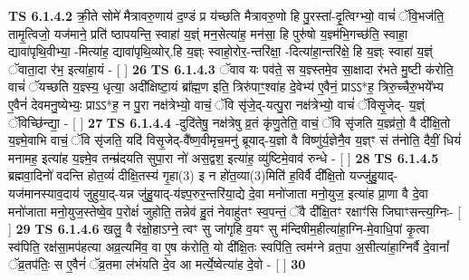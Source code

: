 \documentclass[17pt]{extarticle}
\begin{document}
                                \textbf{ TS 6.1.4.2} \newline
                  क्री॒ते सोमे॑ मैत्रावरु॒णाय॑ द॒ण्डं प्र य॑च्छति मैत्रावरु॒णो हि पु॒रस्ता॑-दृ॒त्विग्भ्यो॒ वाचं॑ ॅवि॒भज॑ति॒ तामृ॒त्विजो॒ यज॑माने॒ प्रति॑ ष्ठापयन्ति॒ स्वाहा॑ य॒ज्ञ्ं मन॒सेत्या॑ह॒ मन॑सा॒ हि पुरु॑षो य॒ज्ञ्म॑भि॒गच्छ॑ति॒ स्वाहा॒ द्यावा॑पृथि॒वीभ्या॒ -मित्या॑ह॒ द्यावा॑पृथि॒व्योर्.हि य॒ज्ञ्ः स्वाहो॒रोर॒-न्तरि॑क्षा॒ -दित्या॑हा॒न्तरि॑क्षे॒ हि य॒ज्ञ्ः स्वाहा॑ य॒ज्ञ्ं ॅवाता॒दा र॑भ॒ इत्या॑हा॒यं - [  ] \textbf{  26} \newline
                  \newline
                                \textbf{ TS 6.1.4.3} \newline
                  ॅवाव यः पव॑ते॒ स य॒ज्ञ्स्तमे॒व सा॒क्षादा र॑भते मु॒ष्टी क॑रोति॒ वाचं॑ ॅयच्छति य॒ज्ञ्स्य॒ धृत्या॒ अदी᳚क्षिष्टा॒यं ब्रा᳚ह्म॒ण इति॒ त्रिरु॑पाꣳ॒॒श्वा॑ह दे॒वेभ्य॑ ए॒वैनं॒ प्राऽऽ*ह॒ त्रिरु॒च्चैरु॒भये᳚भ्य ए॒वैनं॑ देवमनु॒ष्येभ्यः॒ प्राऽऽ*ह॒ न पु॒रा नक्ष॑त्रेभ्यो॒ वाचं॒ ॅवि सृ॑जे॒द्-यत्पु॒रा नक्ष॑त्रेभ्यो॒ वाचं॑ ॅविसृ॒जेद्- य॒ज्ञ्ं ॅविच्छि॑न्द्या॒ - [  ] \textbf{  27} \newline
                  \newline
                                \textbf{ TS 6.1.4.4} \newline
                  -दुदि॑तेषु॒ नक्ष॑त्रेषु व्र॒तं कृ॑णु॒तेति॒ वाचं॒ ॅवि सृ॑जति य॒ज्ञ्व्र॑तो॒ वै दी᳚क्षि॒तो य॒ज्ञ्मे॒वाभि वाचं॒ ॅवि सृ॑जति॒ यदि॑ विसृ॒जेद्-वै᳚ष्ण॒वीमृच॒मनु॑ ब्रूयाद्-य॒ज्ञो वै विष्णु॑र्य॒ज्ञेनै॒व य॒ज्ञ्ꣳ सं त॑नोति॒ दैवीं॒ धियं॑ मनामह॒ इत्या॑ह य॒ज्ञ्मे॒व तन्म्र॑दयति सुपा॒रा नो॑ अस॒द्वश॒ इत्या॑ह॒ व्यु॑ष्टिमे॒वाव॑ रुन्धे - [  ] \textbf{  28} \newline
                  \newline
                                \textbf{ TS 6.1.4.5} \newline
                  ब्रह्मवा॒दिनो॑ वदन्ति होत॒व्यं॑ दीक्षि॒तस्य॑ गृ॒हा(3) इ न हो॑त॒व्या(3)मिति॑ ह॒विर्वै दी᳚क्षि॒तो यज्जु॑हु॒याद्-यज॑मानस्याव॒दाय॑ जुहुया॒द्-यन्न जु॑हु॒याद्-य॑ज्ञ्प॒रुर॒न्तरि॑या॒द्ये दे॒वा मनो॑जाता मनो॒युज॒ इत्या॑ह प्रा॒णा वै दे॒वा मनो॑जाता मनो॒युज॒स्तेष्वे॒व प॒रोक्षं॑ जुहोति॒ तन्नेव॑ हु॒तं नेवाहु॑तꣳ स्व॒पन्तं॒ ॅवै दी᳚क्षि॒तꣳ रक्षाꣳ॑सि जिघाꣳसन्त्य॒ग्निः- [  ] \textbf{  29} \newline
                  \newline
                                \textbf{ TS 6.1.4.6} \newline
                  खलु॒ वै र॑क्षो॒हाऽग्ने॒ त्वꣳ सु जा॑गृहि व॒यꣳ सु म॑न्दिषीम॒हीत्या॑हा॒ग्नि-मे॒वाधि॒पां कृ॒त्वा स्व॑पिति॒ रक्ष॑सा॒मप॑हत्या अव्र॒त्यमि॑व॒ वा ए॒ष क॑रोति॒ यो दी᳚क्षि॒तः स्वपि॑ति॒ त्वम॑ग्ने व्रत॒पा अ॒सीत्या॑हा॒ग्निर्वै दे॒वानां᳚ ॅव्र॒तप॑तिः॒ स ए॒वैनं॑ ॅव्र॒तमा ल॑भंयति दे॒व आ मर्त्ये॒ष्वेत्या॑ह दे॒वो - [  ] \textbf{  30} \newline
\end{document}
